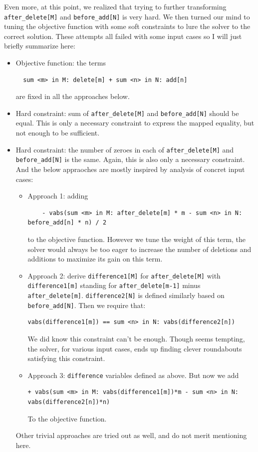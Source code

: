 \documentclass{article}
\begin{document}
Even more, at this point, we realized that trying to further transforming \texttt{after\_delete[M]} and \texttt{before\_add[N]} is very hard. We then turned our mind to tuning the objective function with some soft constraints to lure the solver to the correct solution. These attempts all failed with some input cases so I will just briefly summarize here:
\begin{itemize}
  \item Objective function: the terms
  \begin{lstlisting}
  sum <m> in M: delete[m] + sum <n> in N: add[n]
  \end{lstlisting}
   are fixed in all the approaches below. 
  \item Hard constraint: sum of \texttt{after\_delete[M]}  and \texttt{before\_add[N]} should be equal. This is only a necessary constraint to express the mapped equality, but not enough to be sufficient.
  \item Hard constraint: the number of zeroes in each of \texttt{after\_delete[M]} and \texttt{before\_add[N]} is the same. Again, this is also only a necessary constraint. \\

  And the below appraoches are mostly inspired by analysis of concret input cases:
  \begin{itemize}
    \item Approach 1: adding 
    \begin{lstlisting}
    - vabs(sum <m> in M: after_delete[m] * m - sum <n> in N: before_add[n] * n) / 2
    \end{lstlisting}
     to the objective function. However we tune the weight of this term, the solver would always be too eager to increase the number of deletions and additions to maximize its gain on this term.
    \item Approach 2: derive \texttt{difference1[M]} for \texttt{after_delete[M]} with \texttt{difference1[m]} standing for \texttt{after_delete[m-1]} minus \texttt{after_delete[m]}. \texttt{difference2[N]} is defined similarly based on \texttt{before_add[N]}. Then we require that:
    \begin{lstlisting}
vabs(difference1[m]) == sum <n> in N: vabs(difference2[n])
    \end{lstlisting}
    We did know this constraint can't be enough. Though seems tempting, the solver, for various input cases, ends up finding clever roundabouts satisfying this constraint. 
    \item Approach 3: \texttt{difference} variables defined as above. But now we add 
    \begin{lstlisting}
+ vabs(sum <m> in M: vabs(difference1[m])*m - sum <n> in N: vabs(difference2[n])*n)
    \end{lstlisting}
    To the objective function.
  \end{itemize}
  Other trivial approaches are tried out as well, and do not merit mentioning here. 
\end{itemize}
\end{document}
